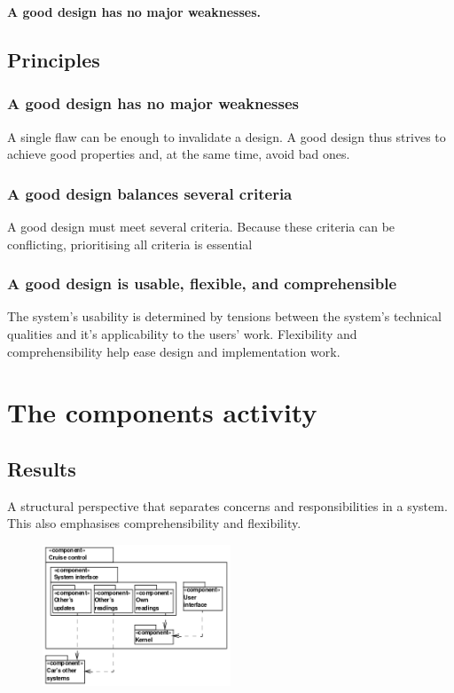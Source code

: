\begin{center}
    \textbf{A good design has no major weaknesses.}
\end{center}

\subsection{Principles}
\subsubsection{A good design has no major weaknesses}
A single flaw can be enough to invalidate a design. A good design thus strives to achieve good properties and, at the same time, avoid bad ones.

\subsubsection{A good design balances several criteria}
A good design must meet several criteria. Because these criteria can be conflicting, prioritising all criteria is essential

\subsubsection{A good design is usable, flexible, and comprehensible}
The system's usability is determined by tensions between the system's technical qualities and it's applicability to the users' work. Flexibility and comprehensibility help ease design and implementation work.

\section{The components activity}
\subsection{Results}
A structural perspective that separates concerns and responsibilities in a system. This also emphasises comprehensibility and flexibility. 
\begin{figure}[H]
    \centering
    \includegraphics[width=0.5\textwidth]{figures/componentsresult.png}
\end{figure}

